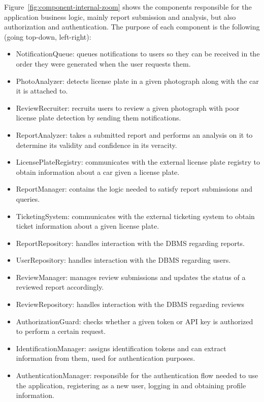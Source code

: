 Figure~\ref{fig:component-internal-zoom} shows the components responsible for the application business logic, mainly report submission and analysis, but also authorization and authentication.
The purpose of each component is the following (going top-down, left-right):
\begin{itemize}
    \item NotificationQueue: queues notifications to users so they can be received in the order they were generated when the user requests them.
    \item PhotoAnalyzer: detects license plate in a given photograph along with the car it is attached to.
    \item ReviewRecruiter: recruits users to review a given photograph with poor license plate detection by sending them notifications.
    \item ReportAnalyzer: takes a submitted report and performs an analysis on it to determine its validity and confidence in its veracity. 
    \item LicensePlateRegistry: communicates with the external license plate registry to obtain information about a car given a license plate.
    \item ReportManager: contains the logic needed to satisfy report submissions and queries.
    \item TicketingSystem: communicates with the external ticketing system to obtain ticket information about a given license plate.
    \item ReportRepository: handles interaction with the DBMS regarding reports.
    \item UserRepository: handles interaction with the DBMS regarding users.
    \item ReviewManager: manages review submissions and updates the status of a reviewed report accordingly.
    \item ReviewRepository: handles interaction with the DBMS regarding reviews
    \item AuthorizationGuard: checks whether a given token or API key is authorized to perform a certain request.
    \item IdentificationManager: assigns identification tokens and can extract information from them, used for authentication purposes.
    \item AuthenticationManager: responsible for the authentication flow needed to use the application, registering as a new user, logging in and obtaining profile information.
\end{itemize}

